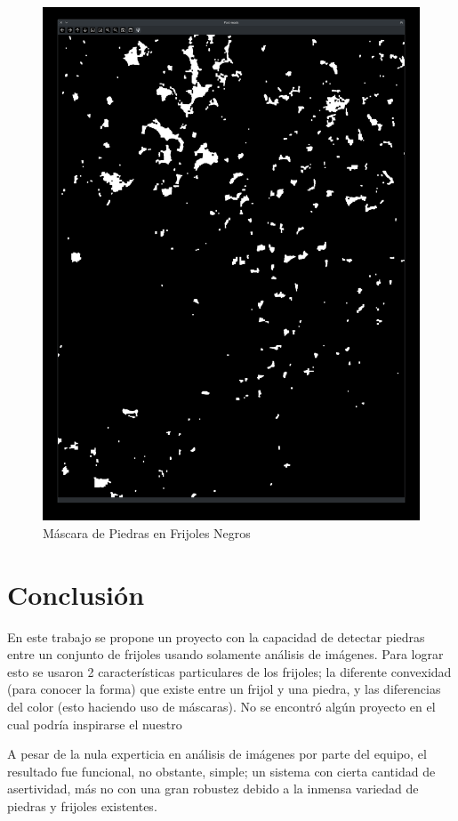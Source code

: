 \documentclass[conference]{IEEEtran}
\begin{document}
    \begin{figure}[H]
        \centering
        \includegraphics[width=\breite\linewidth]{images/mascara_negros.png}
        \caption{Máscara de Piedras en Frijoles Negros}
        \label{fig:mascara_negros}
    \end{figure}

\section{Conclusión}
    En este trabajo se propone un proyecto con la capacidad de detectar piedras entre un conjunto de frijoles usando solamente análisis de imágenes. Para lograr esto se usaron 2 características particulares de los frijoles; la diferente convexidad (para conocer la forma) que existe entre un frijol y una piedra, y las diferencias del color (esto haciendo uso de máscaras\cite{mask}). No se encontró algún proyecto en el cual podría inspirarse el nuestro 

    A pesar de la nula experticia en análisis de imágenes por parte del equipo, el resultado fue funcional, no obstante, simple; un sistema con cierta cantidad de asertividad, más no con una gran robustez debido a la inmensa variedad de piedras y frijoles existentes.
    

\nocite{*}
\printbibliography
\end{document}
